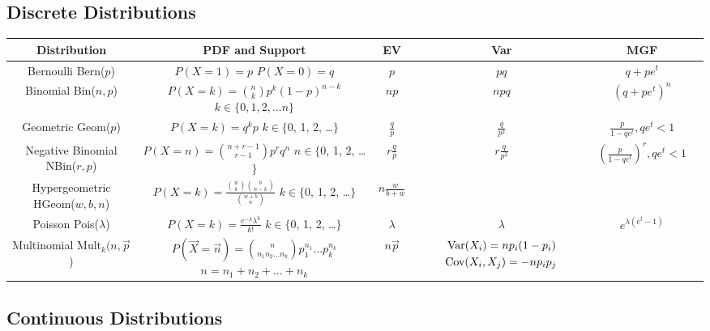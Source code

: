 \documentclass[11pt]{article}
\theoremstyle{definition}
\theoremstyle{remark}
\renewcommand{\var}{\textnormal{Var}}
\newcommand{\cov}{\textnormal{Cov}}
\newcommand{\Bin}{\textnormal{Bin}}
\newcommand{\Bern}{\textnormal{Bern}}
\newcommand{\Geom}{\textnormal{Geom}}
\newcommand{\Pois}{\textnormal{Pois}}
\newcommand{\NBin}{\textnormal{NBin}}
\newcommand{\HGeom}{\textnormal{HGeom}}
\newcommand{\Mult}{\textrm{Mult}}
\begin{document}
\subsection*{Discrete Distributions}
\begin{center}
\begin{tabular}{cccccc}
\textbf{Distribution} & \textbf{PDF and Support} & \textbf{EV}  & \textbf{Var} & \textbf{MGF}\\
\hline
\shortstack{Bernoulli \\ \Bern($p$)} & \shortstack{$P(X=1) = p$ \\$ P(X=0) = q$} & $p$ & $pq$ & $q + pe^t$ \\
\hline
\shortstack{Binomial \\ \Bin($n, p$)} & \shortstack{$P(X=k) = {n \choose k}p^k(1-p)^{n-k}$  \\ $k \in \{0, 1, 2, \dots n\}$}& $np$ & $npq$ & $(q + pe^t)^n$ \\
\hline
\shortstack{Geometric \\ \Geom($p$)} & \shortstack{$P(X=k) = q^kp$  \\ $k \in \{$0, 1, 2, \dots $\}$}& $\frac{q}{p}$ & $\frac{q}{p^2}$ & $\frac{p}{1-qe^t}, qe^t < 1$\\
\hline
\shortstack{Negative Binomial \\ \NBin($r, p$)} & \shortstack{$P(X=n) = {n+r - 1 \choose r -1}p^rq^n$ \\ $n \in \{$0, 1, 2, \dots $\}$} & $r\frac{q}{p}$ & $r\frac{q}{p^2}$ &  $(\frac{p}{1-qe^t})^r, qe^t < 1$\\
\hline
\shortstack{Hypergeometric \\ \HGeom($w, b, n$)} & \shortstack{$P(X=k) = \frac{{w \choose k}{b \choose n-k}}{{w + b \choose n}}$ \\ $k \in \{$0, 1, 2, \dots $\}$} & $n\frac{w}{b+w}$ &&  \\
\hline
\shortstack{Poisson \\ \Pois($\lambda$)} & \shortstack{$P(X=k) = \frac{e^{-\lambda}\lambda^k}{k!}$ \\ $k \in \{$0, 1, 2, \dots $\}$} & $\lambda$ & $\lambda$ & $e^{\lambda(e^t-1)}$ \\
\hline
\shortstack{Multinomial \\ \Mult$_k(n, \vec{p}$)} & \shortstack{$P(\vec{X} = \vec{n}) = {n \choose n_1n_2\dots n_k}p_1^{n_1}\dots p_k^{n_k}$ \\ $n = n_1 + n_2 + \dots + n_k$} & $n\vec{p}$ & \shortstack{$\var(X_i) = np_i(1-p_i)$ \\ $\cov(X_i, X_j) = -np_ip_j$} &  \\

\end{tabular}
\end{center}\subsection*{Continuous Distributions}
\end{document}
